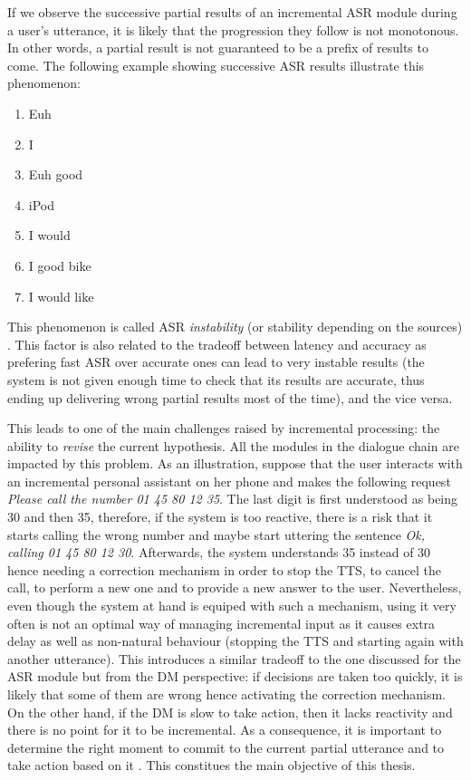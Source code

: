                 If we observe the successive partial results of an incremental ASR module during a user's utterance, it is likely that the progression they follow is not monotonous. In other words, a partial result is not guaranteed to be a prefix of results to come. The following example showing successive ASR results illustrate this phenomenon:

                \begin{enumerate}
                  \item Euh
                  \item I
                  \item Euh good
                  \item iPod
                  \item I would
                  \item I good bike
                  \item I would like
                \end{enumerate}

                This phenomenon is called ASR \textit{instability} (or stability depending on the sources) \cite{Selfridge2011}. This factor is also related to the tradeoff between latency and accuracy as prefering fast ASR over accurate ones can lead to very instable results (the system is not given enough time to check that its results are accurate, thus ending up delivering wrong partial results most of the time), and the vice versa.
								
		This leads to one of the main challenges raised by incremental processing: the ability to \textit{revise} the current hypothesis. All the modules in the dialogue chain are impacted by this problem. As an illustration, suppose that the user interacts with an incremental personal assistant on her phone and makes the following request \textit{Please call the number 01 45 80 12 35}. The last digit is first understood as being 30 and then 35, therefore, if the system is too reactive, there is a risk that it starts calling the wrong number and maybe start uttering the sentence \textit{Ok, calling 01 45 80 12 30}. Afterwards, the system understands 35 instead of 30 hence needing a correction mechanism in order to stop the TTS, to cancel the call, to perform a new one and to provide a new answer to the user. Nevertheless, even though the system at hand is equiped with such a mechanism, using it very often is not an optimal way of managing incremental input as it causes extra delay as well as non-natural behaviour (stopping the TTS and starting again with another utterance). This introduces a similar tradeoff to the one discussed for the ASR module but from the DM perspective: if decisions are taken too quickly, it is likely that some of them are wrong hence activating the correction mechanism. On the other hand, if the DM is slow to take action, then it lacks reactivity and there is no point for it to be incremental. As a consequence, it is important to determine the right moment to commit to the current partial utterance and to take action based on it \cite{Raux2008,Lu2011}. This constitues the main objective of this thesis.


